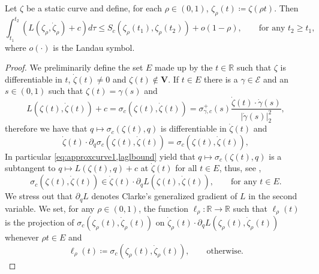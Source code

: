 \documentclass[11pt,a4paper,american]{article}
\newcommand{\Ecal}{\mathcal E}
\newcommand{\Rds}{\mathds R}
\newcommand{\Vbf}{\mathbf V}
\begin{document}
    \begin{lem}\label{approxcurve}
        Let $\zeta$ be a static curve and define, for each $\rho\in(0,1)$, $\zeta_\rho(t)\coloneqq\zeta(\rho t)$. Then
        \begin{equation}\label{eq:approxcurve.1}
            \int_{t_1}^{t_2}\left(L\left(\zeta_\rho,\dot\zeta_\rho\right)+c\right)d\tau\le S_c(\zeta_\rho(t_1),\zeta_\rho(t_2))+o(1-\rho),\qquad\text{for any }t_2\ge t_1,
        \end{equation}
        where $o(\cdot)$ is the Landau symbol.
    \end{lem}
    \begin{proof}
        We preliminarily define the set $E$ made up by the $t\in\Rds$ such that $\zeta$ is differentiable in $t$, $\dot\zeta(t)\ne0$ and $\zeta(t)\notin\Vbf$. If $t\in E$ there is a $\gamma\in\Ecal$ and an $s\in(0,1)$ such that $\zeta(t)=\gamma(s)$ and
        \begin{equation}\label{eq:approxcurve1}
            L\left(\zeta(t),\dot\zeta(t)\right)+c=\sigma_c\left(\zeta(t),\dot\zeta(t)\right)=\sigma_{\gamma,c}^+(s)\frac{\dot\zeta(t)\cdot\dot\gamma(s)}{|\dot\gamma(s)|_2^2},
        \end{equation}
        therefore we have that $q\mapsto\sigma_c(\zeta(t),q)$ is differentiable in $\dot\zeta(t)$ and
        \begin{equation*}
            \dot\zeta(t)\cdot\partial_q\sigma_c\left(\zeta(t),\dot\zeta(t)\right)=\sigma_c\left(\zeta(t),\dot\zeta(t)\right),
        \end{equation*}
        In particular \cref{eq:approxcurve1,laglbound} yield that $q\mapsto\sigma_c(\zeta(t),q)$ is a subtangent to $q\mapsto L(\zeta(t),q)+c$ at $\dot\zeta(t)$ for all $t\in E$, thus, see \cite[Proposition 2.2.7]{Clarke90},
        \begin{equation}\label{eq:approxcurve2}
            \sigma_c\left(\zeta(t),\dot\zeta(t)\right)\in\dot\zeta(t)\cdot\partial_q L\left(\zeta(t),\dot\zeta(t)\right),\qquad\text{for any }t\in E.
        \end{equation}
        We stress out that $\partial_q L$ denotes Clarke's generalized gradient of $L$ in the second variable. We set, for any $\rho\in(0,1)$, the function $\ell_\rho:\Rds\to\Rds$ such that $\ell_\rho(t)$ is the projection of $\sigma_c\left(\zeta_\rho(t),\dot\zeta_\rho(t)\right)$ on $\dot\zeta_\rho(t)\cdot\partial_q L\left(\zeta_\rho(t),\dot\zeta_\rho(t)\right)$ whenever $\rho t\in E$ and
        \begin{equation*}
            \ell_\rho(t)\coloneqq\sigma_c\left(\zeta_\rho(t),\dot\zeta_\rho(t)\right),\qquad\text{otherwise}.

\end{equation*}
\end{proof}
\end{document}
